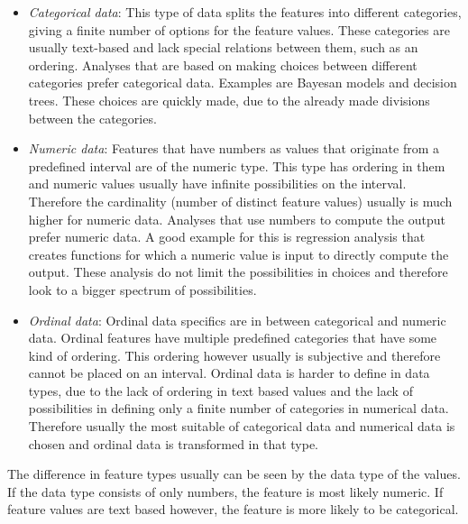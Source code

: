 \documentclass[10pt,a4paper]{article}
\begin{document}
	\begin{itemize}
		\item \textit{Categorical data}: This type of data splits the features into different categories, giving a finite number of options for the feature values. These categories are usually text-based and lack special relations between them, such as an ordering\cite{agresti2003categorical}. Analyses that are based on making choices between different categories prefer categorical data. Examples are Bayesan models\cite{congdon2005bayesian} and decision trees\cite{safavian1991survey}. These choices are quickly made, due to the already made divisions between the categories.
		\item \textit{Numeric data}: Features that have numbers as values that originate from a predefined interval are of the numeric type. This type has ordering in them and numeric values usually have infinite possibilities on the interval. Therefore the cardinality (number of distinct feature values) usually is much higher for numeric data\cite{edwards2002explaining}. Analyses that use numbers to compute the output prefer numeric data. A good example for this is regression analysis\cite{gelman2006data} that creates functions for which a numeric value is input to directly compute the output. These analysis do not limit the possibilities in choices and therefore look to a bigger spectrum of possibilities.
		\item \textit{Ordinal data}: Ordinal data specifics are in between categorical and numeric data. Ordinal features have multiple predefined categories that have some kind of ordering. This ordering however usually is subjective and therefore cannot be placed on an interval\cite{han2011data}. Ordinal data is harder to define in data types, due to the lack of ordering in text based values and the lack of possibilities in defining only a finite number of categories in numerical data. Therefore usually the most suitable of categorical data and numerical data is chosen and ordinal data is transformed in that type.
	\end{itemize}
	
	The difference in feature types usually can be seen by the data type of the values. If the data type consists of only numbers, the feature is most likely numeric. If feature values are text based however, the feature is more likely to be categorical.
	
\end{document}
